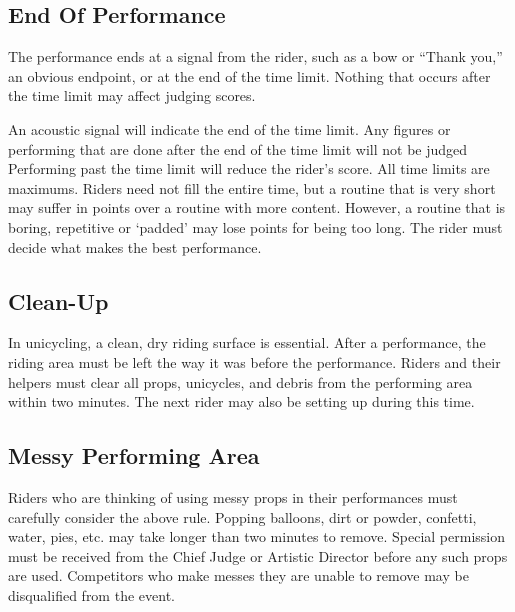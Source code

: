 \subsection{End Of Performance}
The performance ends at a signal from the rider, such as a bow or ``Thank you,'' an obvious endpoint, or at the end of the time limit.
Nothing that occurs after the time limit may affect judging scores.

An acoustic signal will indicate the end of the time limit.
Any figures or performing that are done after the end of the time limit will not be judged Performing past the time limit will reduce the rider's score.
All time limits are maximums.
Riders need not fill the entire time, but a routine that is very short may suffer in points over a routine with more content.
However, a routine that is boring, repetitive or `padded' may lose points for being too long.
The rider must decide what makes the best performance.

\subsection{Clean-Up}
In unicycling, a clean, dry riding surface is essential.
After a performance, the riding area must be left the way it was before the performance.
Riders and their helpers must clear all props, unicycles, and debris from the performing area within two minutes.
The next rider may also be setting up during this time.

\subsection{Messy Performing Area}
Riders who are thinking of using messy props in their performances must carefully consider the above rule.
Popping balloons, dirt or powder, confetti, water, pies, etc.
may take longer than two minutes to remove.
Special permission must be received from the Chief Judge or Artistic Director before any such props are used.
Competitors who make messes they are unable to remove may be disqualified from the event.

